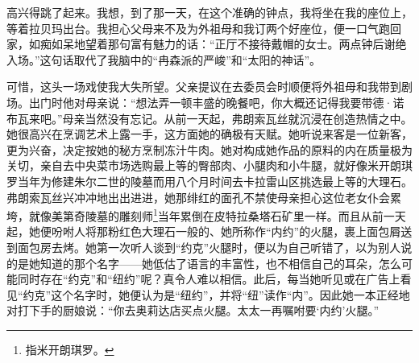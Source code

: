 高兴得跳了起来。我想，到了那一天，在这个准确的钟点，我将坐在我的座位上，等着拉贝玛出台。我担心父母来不及为外祖母和我订两个好座位，便一口气跑回家，如痴如呆地望着那句富有魅力的话：“正厅不接待戴帽的女士。两点钟后谢绝入场。”这句话取代了我脑中的“冉森派的严峻”和“太阳的神话”。
\par 可惜，这头一场戏使我大失所望。父亲提议在去委员会时顺便将外祖母和我带到剧场。出门时他对母亲说：“想法弄一顿丰盛的晚餐吧，你大概还记得我要带德·诺布瓦来吧。”母亲当然没有忘记。从前一天起，弗朗索瓦丝就沉浸在创造热情之中。她很高兴在烹调艺术上露一手，这方面她的确极有天赋。她听说来客是一位新客，更为兴奋，决定按她的秘方烹制冻汁牛肉。她对构成她作品的原料的内在质量极为关切，亲自去中央菜市场选购最上等的臀部肉、小腿肉和小牛腿，就好像米开朗琪罗当年为修建朱尔二世的陵墓而用八个月时间去卡拉雷山区挑选最上等的大理石。弗朗索瓦丝兴冲冲地出出进进，她那绯红的面孔不禁使母亲担心这位老女仆会累垮，就像美第奇陵墓的雕刻师\footnote{指米开朗琪罗。}当年累倒在皮特拉桑塔石矿里一样。而且从前一天起，她便吩咐人将那粉红色大理石一般的、她所称作“内约”的火腿，裹上面包屑送到面包房去烤。她第一次听人谈到“约克”火腿时，便以为自己听错了，以为别人说的是她知道的那个名字——她低估了语言的丰富性，也不相信自己的耳朵，怎么可能同时存在“约克”和“纽约”呢？真令人难以相信。此后，每当她听见或在广告上看见“约克”这个名字时，她便认为是“纽约”，并将“纽”读作“内”。因此她一本正经地对打下手的厨娘说：“你去奥莉达店买点火腿。太太一再嘱咐要‘内约’火腿。”
